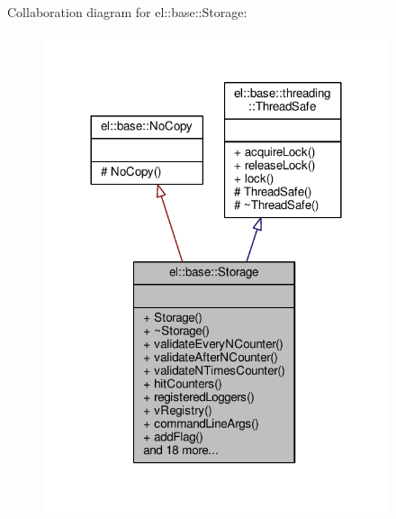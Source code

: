 Collaboration diagram for el\+:\+:base\+:\+:Storage\+:
\nopagebreak
\begin{figure}[H]
\begin{center}
\leavevmode
\includegraphics[width=288pt]{db/d68/classel_1_1base_1_1Storage__coll__graph}
\end{center}
\end{figure}
